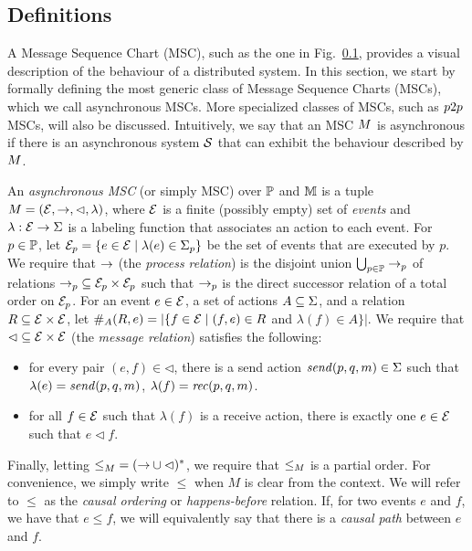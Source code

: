 \subsection{Definitions}

A Message Sequence Chart (MSC), such as the one in Fig.~\ref{}, provides a visual description of the behaviour of a distributed system. In this section, we start by formally defining the most generic class of Message Sequence Charts (MSCs), which we call asynchronous MSCs. More specialized classes of MSCs, such as $\pp$ MSCs, will also be discussed. Intuitively, we say that an MSC $\msc$ is asynchronous if there is an asynchronous system $\System$ that can exhibit the behaviour described by $\msc$. 

\begin{definition}
An \emph{asynchronous MSC} (or simply MSC) over $\Procs$ and $\Msg$ is a tuple $\msc = (\Events,\procrel,\lhd,\lambda)$, where $\Events$ is a finite (possibly empty) set of \emph{events} and $\lambda: \Events \to \Act$ is a labeling function that associates an action to each event. For $p \in \Procs$, let $\Events_p = \{e \in \Events \mid \lambda(e) \in \pAct{p}\}$ be the set of events that are executed by $p$. We require that $\procrel$ (the \emph{process relation}) is the disjoint union $\bigcup_{p \in \Procs} \procrel_p$ of relations ${\procrel_p} \subseteq \Events_p \times \Events_p$ such that $\procrel_p$ is the direct successor relation of a total order on $\Events_p$. For an event $e \in \Events$, a set of actions $A \subseteq \Act$, and a relation $\rel \subseteq \Events \times \Events$,
let $\sametype{e}{A}{\rel} = |\{f \in \Events \mid (f,e) \in \rel$ and $\lambda(f) \in A\}|$. We require that ${\lhd} \subseteq \Events \times \Events$ (the \emph{message relation}) satisfies the following:
\begin{itemize}\itemsep=0.5ex
\item[(1)] for every pair $(e,f) \in {\lhd}$, there is a send action $\sact{p}{q}{\msg} \in \Act$ such that $\lambda(e) = \sact{p}{q}{\msg}$, $\lambda(f) = \ract{p}{q}{\msg}$.
\item[(2)] for all $f \in \Events$ such that $\lambda(f)$ is a receive action, there is exactly one $e \in \Events$ such that $e \lhd f$.
\end{itemize}
Finally, letting ${\le}_\msc = ({\procrel} \cup {\lhd})^\ast$,
we require that $\le_\msc$ is a partial order. For convenience, we simply write $\le$ when $M$ is clear from the context. We will refer to $\le$ as the \emph{causal ordering} or \emph{happens-before} relation. If, for two events $e$ and $f$, we have that $e \le f$, we will equivalently say that there is a \emph{causal path} between $e$ and $f$.
\end{definition}

